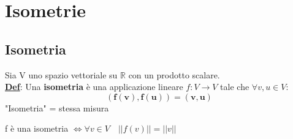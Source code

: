 \documentclass[12pt]{article}
\begin{document}
\section{Isometrie}
\subsection{Isometria}
Sia V uno spazio vettoriale su $\mathbb{R}$ con un prodotto scalare.\\
\textbf{\underline{Def}}: Una \textbf{isometria} è una applicazione lineare $f : V \longrightarrow V$ tale che $\forall v,u \in V$:$$\boldsymbol{(f(v), f(u)) = (v,u)}$$
"Isometria" = stessa misura\\
\begin{theorem}
    f è una isometria $\iff \forall v\in V\quad ||f(v)|| = ||v||$
\end{theorem}
\end{document}
